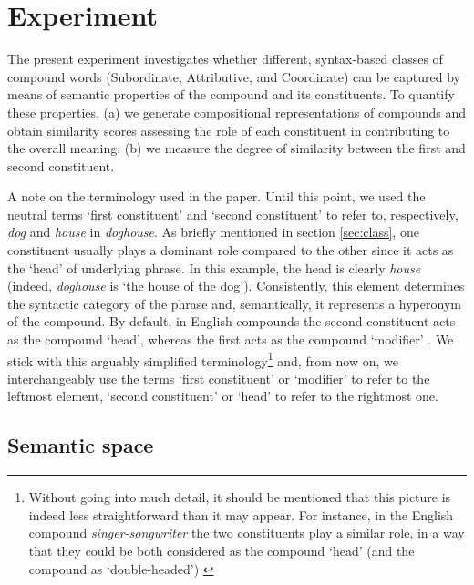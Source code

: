 \section{Experiment}
\label{sec:experiments}

The present experiment investigates whether different, syntax-based classes of compound words (Subordinate, Attributive, and Coordinate) can be captured by means of semantic properties of the compound and its constituents. To quantify these properties, (a) we generate compositional representations of compounds and obtain similarity scores assessing the role of each constituent in contributing to the overall meaning; (b) we measure the degree of similarity between the first and second constituent.

A note on the terminology used in the paper. Until this point, we used the neutral terms `first constituent' and `second constituent' to refer to, respectively, \emph{dog} and \emph{house} in \emph{doghouse}. As briefly mentioned in section \ref{sec:class}, one constituent usually plays a dominant role compared to the other since it acts as the `head' of underlying phrase. In this example, the head is clearly \emph{house} (indeed, \emph{doghouse} is `the house of the dog'). Consistently, this element determines the syntactic category of the phrase and, semantically, it represents a hyperonym of the compound. By default, in English compounds the second constituent acts as the compound `head', whereas the first acts as the compound `modifier' \citep{bauerOHC}. We stick with this arguably simplified terminology\footnote{Without going into much detail, it should be mentioned that this picture is indeed less straightforward than it may appear. For instance, in the English compound \emph{singer-songwriter} the two constituents play a similar role, in a way that they could be both considered as the compound `head' (and the compound as `double-headed') \citep{bauerOHC}} and, from now on, we interchangeably use the terms `first constituent' or `modifier' to refer to the leftmost element, `second constituent' or `head' to refer to the rightmost one.


\subsection{Semantic space}\label{sec:vectors}

